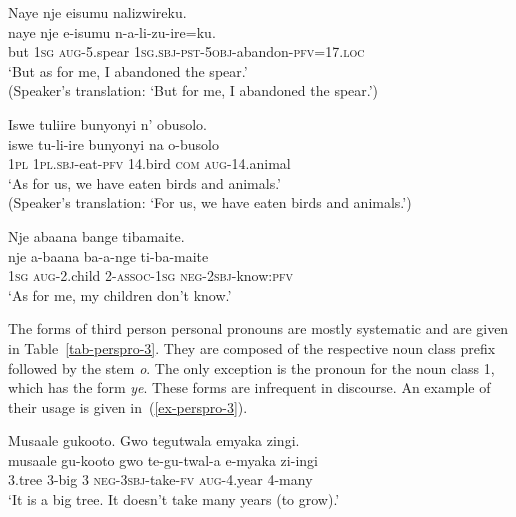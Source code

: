\ea \label{ex-perspro-topic}
\begin{xlist}	
    \ex \label{ex-perspro-topic-a}
    \glll Naye 	nje		eisumu 	nalizwireku.\\
         naye 	nje		e-isumu 	n-a-li-zu-ire=ku.\\
	but 	1\textsc{sg}	\textsc{aug}-5.spear	\textsc{1sg.sbj}-\textsc{pst}-\textsc{5obj}-abandon-\textsc{pfv}=17.\textsc{loc}\\
    \glt  ‘But as for me, I abandoned the spear.’\\
	(Speaker’s translation: `But for me, I abandoned the spear.')

   \ex  \label{ex-perspro-topic-b}
    \glll Iswe 	tuliire 	bunyonyi 	n' obusolo.\\
         iswe 	tu-li-ire 	bunyonyi 	na 	o-busolo\\
	1\textsc{pl}	1\textsc{pl.sbj}-eat-\textsc{pfv}	14.bird 	\textsc{com}	 \textsc{aug}-14.animal\\
    \glt  ‘As for us, we have eaten birds and animals.’\\ (Speaker’s translation: `For us, we have eaten birds and animals.')
 
    \ex  \label{ex-perspro-topic-c}
    \glll Nje abaana bange tibamaite.\\
         nje a-baana ba-a-nge ti-ba-maite\\
	1\textsc{sg}	\textsc{aug}-2.child 2-\textsc{assoc}-\textsc{1sg} \textsc{neg}-\textsc{2sbj}-know:\textsc{pfv}\\
    \glt  ‘As for me, my children don't know.'
\end{xlist}	
\z

The forms of third person personal pronouns are mostly systematic and are given in Table~\ref{tab-perspro-3}. They are  composed of the respective noun class prefix followed by the stem \textit{o}. 
The only exception is the pronoun for the noun class 1, which has the form \textit{ye}.
These forms are infrequent in discourse. 
An example of their usage is given in~(\ref{ex-perspro-3}).

\ea \label{ex-perspro-3}
    \glll Musaale	gukooto. Gwo	tegutwala		emyaka	zingi.\\
         musaale	gu-kooto gwo	te-gu-twal-a		e-myaka	zi-ingi\\
	3.tree		 3-big  	3	\textsc{neg}-\textsc{3sbj}-take-\textsc{fv}	\textsc{aug}-4.year	4-many\\
    \glt  ‘It is a big tree. It doesn't take many years (to grow).’
\z

